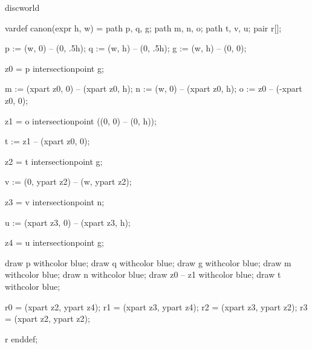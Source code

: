 

\startenvironment discworld

	\setuppagenumbering[alternative=doublesided]

	\startMPdefinitions
		vardef canon(expr h, w) =
			path p, q, g;
			path m, n, o;
			path t, v, u;
			pair r[];

			p := (w,  0) -- (0, .5h); %
			q := (w,  h) -- (0, .5h); %
			g := (w,  h) -- (0, 0); %

			z0 = p intersectionpoint g; %

			m := (xpart z0, 0) -- (xpart z0, h); %
			n := (w, 0) -- (xpart z0, h); %
			o := z0 -- (-xpart z0, 0); %

			z1 = o intersectionpoint ((0, 0) -- (0, h)); %

			t := z1 -- (xpart z0, 0); %

			z2 = t intersectionpoint g; %

			v := (0, ypart z2) -- (w, ypart z2); %

			z3 = v intersectionpoint n; %

			u := (xpart z3, 0) -- (xpart z3, h); %

			z4 = u intersectionpoint g; %

			draw p withcolor blue;
			draw q withcolor blue;
			draw g withcolor blue;
			draw m withcolor blue;
			draw n withcolor blue;
			draw z0 -- z1 withcolor blue;
			draw t withcolor blue;

			r0 = (xpart z2, ypart z4); %
			r1 = (xpart z3, ypart z4); %
			r2 = (xpart z3, ypart z2); %
			r3 = (xpart z2, ypart z2); %

			r
		enddef;

	\stopMPdefinitions

\stopenvironment

